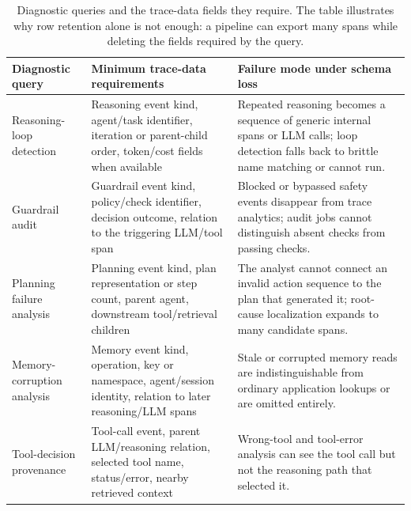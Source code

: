 \documentclass[conference]{IEEEtran}
\begin{document}
\begin{table}[t]
\centering
\scriptsize
\caption{Diagnostic queries and the trace-data fields they require. The
table illustrates why row retention alone is not enough: a pipeline can
export many spans while deleting the fields required by the query.}
\label{tab:queries}
\begin{tabular}{@{}p{}p{}p{}@{}}
\toprule
\textbf{Diagnostic query} & \textbf{Minimum trace-data requirements} & \textbf{Failure mode under schema loss} \\
\midrule
Reasoning-loop detection & Reasoning event kind, agent/task identifier, iteration or parent-child order, token/cost fields when available & Repeated reasoning becomes a sequence of generic internal spans or LLM calls; loop detection falls back to brittle name matching or cannot run. \\
\addlinespace
Guardrail audit & Guardrail event kind, policy/check identifier, decision outcome, relation to the triggering LLM/tool span & Blocked or bypassed safety events disappear from trace analytics; audit jobs cannot distinguish absent checks from passing checks. \\
\addlinespace
Planning failure analysis & Planning event kind, plan representation or step count, parent agent, downstream tool/retrieval children & The analyst cannot connect an invalid action sequence to the plan that generated it; root-cause localization expands to many candidate spans. \\
\addlinespace
Memory-corruption analysis & Memory event kind, operation, key or namespace, agent/session identity, relation to later reasoning/LLM spans & Stale or corrupted memory reads are indistinguishable from ordinary application lookups or are omitted entirely. \\
\addlinespace
Tool-decision provenance & Tool-call event, parent LLM/reasoning relation, selected tool name, status/error, nearby retrieved context & Wrong-tool and tool-error analysis can see the tool call but not the reasoning path that selected it. \\
\bottomrule
\end{tabular}
\end{table}
\end{document}
